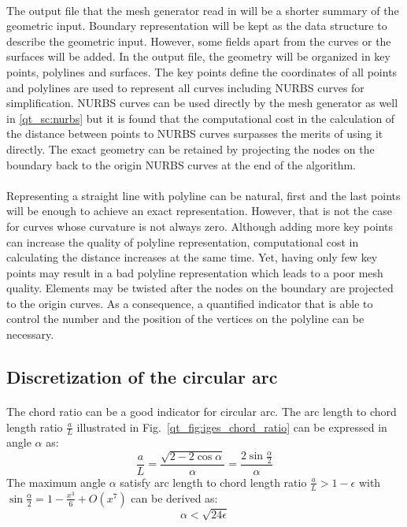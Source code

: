 \paragraph{}
The output file that the mesh generator read in will be a shorter summary of the geometric input.
Boundary representation will be kept as the data structure to describe the geometric input.
However, some fields apart from the curves or the surfaces will be added.
In the output file, the geometry will be organized in key points, polylines and surfaces.
The key points define the coordinates of all points and polylines are used to represent all curves including NURBS curves for simplification.
NURBS curves can be used directly by the mesh generator as well in \ref{qt_sc:nurbs} but it is found that the computational cost in the calculation of the distance between points to NURBS curves surpasses the merits of using it directly.
The exact geometry can be retained by projecting the nodes on the boundary back to the origin NURBS curves at the end of the algorithm.

\paragraph{}
Representing a straight line with polyline can be natural, first and the last points will be enough to achieve an exact representation.
However, that is not the case for curves whose curvature is not always zero.
Although adding more key points can increase the quality of polyline representation, computational cost in calculating the distance increases at the same time.
Yet, having only few key points may result in a bad polyline representation which leads to a poor mesh quality.
Elements may be twisted after the nodes on the boundary are projected to the origin curves.
As a consequence, a quantified indicator that is able to control the number and the position of the vertices on the polyline can be necessary.

\subsection{Discretization of the circular arc}
\paragraph{}
The chord ratio can be a good indicator for circular arc.
The arc length to chord length ratio $\frac{a}{L}$ illustrated in Fig.~\ref{qt_fig:iges_chord_ratio} can be expressed in angle $\alpha$ as:
    \begin{equation}
        \frac{a}{L} = \frac{
            \sqrt{2-2\cos\alpha}
        }{\alpha}
        = \frac{
            2\sin\frac{\alpha}{2}
        }{\alpha}
    \end{equation}
%
The maximum angle $\alpha$ satisfy arc length to chord length ratio $\frac{a}{L} > 1-\epsilon$ with $
    \sin\frac{\alpha}{2} = 1 - \frac{x^3}{6} + O(x^7)
$ can be derived as:
    \begin{equation}
        \alpha < \sqrt{24 \epsilon}
    \end{equation}

